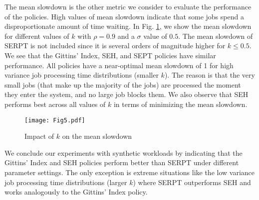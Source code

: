 The mean slowdown is the other metric we consider to evaluate the performance of the policies. High values of mean slowdown indicate that some jobs spend a disproportionate amount of time waiting. In Fig. \ref{fig:25SigmaMSD}, we show the mean slowdown for different values of $k$ with $\rho = 0.9$ and a $\sigma$ value of $0.5$. The mean slowdown of SERPT is not included since it is several orders of magnitude higher for $k \le 0.5$. We see that the Gittins' Index, SEH, and SEPT policies have similar performance. All policies have a near-optimal mean slowdown of 1 for high variance job processing time distributions (smaller $k$). The reason is that the very small jobs (that make up the majority of the jobs) are processed the moment they enter the system, and no large job blocks them. We also observe that SEH performs best across all values of $k$ in terms of minimizing the mean slowdown.



\begin{figure}[ht]

  \texttt{[image: Fig5.pdf]}
  \centering
    \caption{Impact of $k$ on the mean slowdown}
  \label{fig:25SigmaMSD}

\end{figure}



We conclude our experiments with synthetic workloads by indicating that the Gittins' Index and SEH policies perform better than SERPT under different parameter settings. The only exception is extreme situations like the low variance job processing time distributions (larger $k$) where SERPT outperforms SEH and works analogously to the Gittins' Index policy. \\



